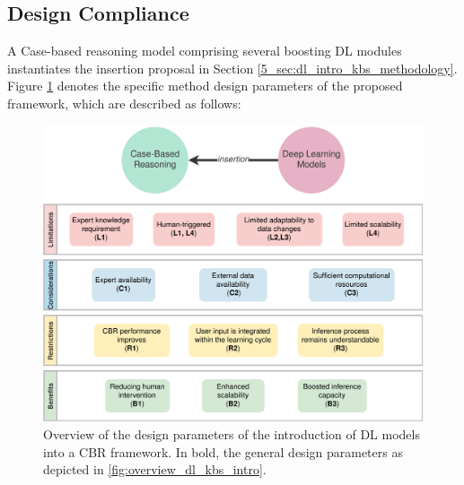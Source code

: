 \color{black}
\subsection{Design Compliance}\label{5_sec:design_compliance}
A Case-based reasoning model comprising several boosting DL modules instantiates the insertion proposal in Section \ref{5_sec:dl_intro_kbs_methodology}. Figure \ref{fig:compliance_dl_into_kbs} denotes the specific method design parameters of the proposed framework, which are described as follows:

\begin{figure}[t]
    \centering
    \includegraphics[width=\linewidth]{5_dlintegrationkbs/figures/Instance_DL_intro_KBS.eps}
    \caption{Overview of the design parameters of the introduction of DL models into a CBR framework. In bold, the general design parameters as depicted in \ref{fig:overview_dl_kbs_intro}.}
    \label{fig:compliance_dl_into_kbs}
\end{figure}

